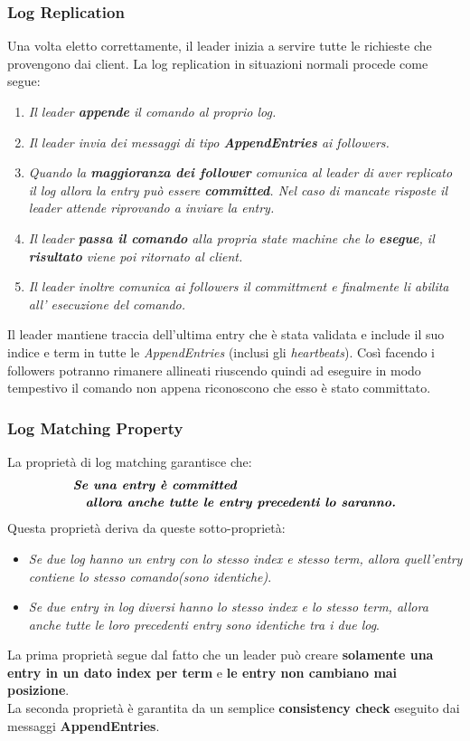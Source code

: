   \subsubsection{Log Replication}
  Una volta eletto correttamente, il leader inizia a servire tutte le richieste che provengono dai client. La log replication in situazioni normali procede come segue:
  \begin{enumerate}
    \item{\emph{Il leader \textbf{appende} il comando al proprio log.}}
    \item{\emph{Il leader invia dei messaggi di tipo \textbf{AppendEntries} ai followers.}}
    \item{\emph{Quando la \textbf{maggioranza dei follower} comunica al leader di aver replicato il log allora la entry può essere \textbf{committed}. Nel caso di mancate risposte il leader attende riprovando a inviare la entry.}}
    \item{\emph{Il leader \textbf{passa il comando} alla propria state machine che lo \textbf{esegue}, il \textbf{risultato} viene poi ritornato al client.}}
    \item{\emph{Il leader inoltre comunica ai followers il committment e finalmente li abilita all' esecuzione del comando.}}
  \end{enumerate}
  Il leader mantiene traccia dell'ultima entry che è stata validata e include il suo indice e term in tutte le \textit{AppendEntries} (inclusi gli \textit{heartbeats}). Così facendo i followers potranno rimanere allineati riuscendo quindi ad eseguire in modo tempestivo il comando non appena riconoscono che esso è stato committato.

  \subsubsection{Log Matching Property}
  \label{Log Matching}
  La proprietà di log matching garantisce che:
  \[
    \begin{multlined}
    \emph{\textbf{Se una entry è committed}}\\
    \emph{\textbf{allora anche tutte 
    le entry precedenti lo saranno.}}
    \end{multlined}
  \]
  Questa proprietà deriva da queste sotto-proprietà:
  \begin{itemize}
    \item{\emph{Se due log hanno un entry con lo stesso index e stesso term, allora quell'entry contiene lo stesso comando(sono identiche)}}.
    \item{\emph{Se due \textit{entry} in log diversi hanno lo stesso index e lo stesso term, allora anche tutte le loro precedenti entry sono identiche tra i due log}}.
  \end{itemize}
  La prima proprietà segue dal fatto che un leader può creare \textbf{solamente una entry in un dato index per term} e \textbf{le entry non cambiano mai posizione}.\\
  La seconda proprietà è garantita da un semplice \textbf{consistency check} eseguito dai messaggi \textbf{AppendEntries}.

